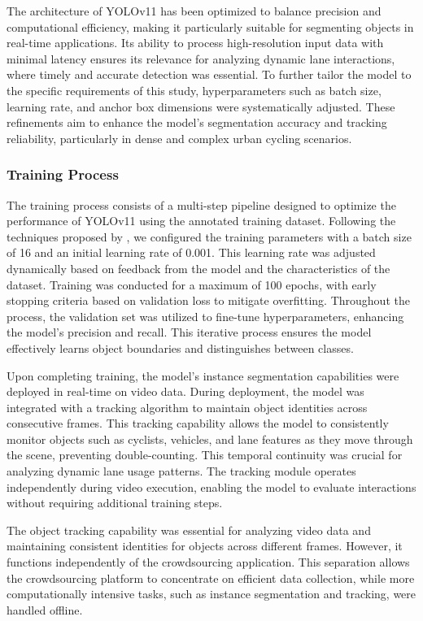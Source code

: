 The architecture of YOLOv11 has been optimized to balance precision and computational efficiency, making it particularly suitable for segmenting objects in real-time applications. Its ability to process high-resolution input data with minimal latency ensures its relevance for analyzing dynamic lane interactions, where timely and accurate detection was essential. To further tailor the model to the specific requirements of this study, hyperparameters such as batch size, learning rate, and anchor box dimensions were systematically adjusted. These refinements aim to enhance the model's segmentation accuracy and tracking reliability, particularly in dense and complex urban cycling scenarios.


\subsubsection{Training Process}
The training process consists of a multi-step pipeline designed to optimize the performance of YOLOv11 using the annotated training dataset. Following the techniques proposed by \citet{Neven:2018}, we configured the training parameters with a batch size of 16 and an initial learning rate of 0.001. This learning rate was adjusted dynamically based on feedback from the model and the characteristics of the dataset. Training was conducted for a maximum of 100 epochs, with early stopping criteria based on validation loss to mitigate overfitting. Throughout the process, the validation set was utilized to fine-tune hyperparameters, enhancing the model's precision and recall. This iterative process ensures the model effectively learns object boundaries and distinguishes between classes.

Upon completing training, the model's instance segmentation capabilities were deployed in real-time on video data. During deployment, the model was integrated with a tracking algorithm to maintain object identities across consecutive frames. This tracking capability allows the model to consistently monitor objects such as cyclists, vehicles, and lane features as they move through the scene, preventing double-counting. This temporal continuity was crucial for analyzing dynamic lane usage patterns. The tracking module operates independently during video execution, enabling the model to evaluate interactions without requiring additional training steps.

The object tracking capability was essential for analyzing video data and maintaining consistent identities for objects across different frames. However, it functions independently of the crowdsourcing application. This separation allows the crowdsourcing platform to concentrate on efficient data collection, while more computationally intensive tasks, such as instance segmentation and tracking, were handled offline.

